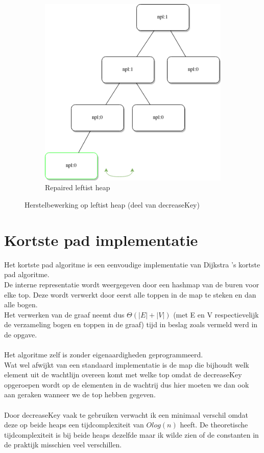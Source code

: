 \documentclass[10pt,a4paper,twoside]{article}
\begin{document}
\begin{figure}[H]
\begin{subfigure}{0.5\linewidth}
        \includegraphics[width=0.9\linewidth]{figures/leftistHeapRepaired.drawio.png}
        \caption{Repaired leftist heap}
        \label{fig:LeftistHeapRepaired}
    \end{subfigure}
    \caption{Herstelbewerking op leftist heap (deel van {\selectfont decreaseKey})}
\end{figure}

\section{Kortste pad implementatie}
Het kortste pad algoritme is een eenvoudige implementatie van Dijkstra 's kortste pad algoritme.\\
De interne representatie wordt weergegeven door een hashmap van de buren voor elke top. Deze wordt verwerkt door eerst alle toppen in de map te steken en dan alle bogen.\\
Het verwerken van de graaf neemt dus $\Theta(|E|+|V|)$ (met E en V respectievelijk de verzameling bogen en toppen in de graaf) tijd in beslag zoals vermeld werd in de opgave.
\\\\
Het algoritme zelf is zonder eigenaardigheden geprogrammeerd.\\
Wat wel afwijkt van een standaard implementatie is de map die bijhoudt welk element uit de wachtlijn overeen komt met welke top omdat de {\selectfont decreaseKey} opgeroepen wordt op de elementen in de wachtrij dus hier moeten we dan ook aan geraken wanneer we de top hebben gegeven.
\\\\
Door {\selectfont decreaseKey} vaak te gebruiken verwacht ik een minimaal verschil omdat deze op beide heaps een tijdcomplexiteit van $O log(n)$ heeft. De theoretische tijdcomplexiteit is bij beide heaps dezelfde maar ik wilde zien of de constanten in de praktijk misschien veel verschillen.
\end{document}
